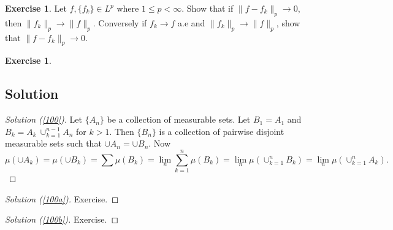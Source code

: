 \documentclass[	DIV=calc,paper=a4,fontsize=11pt]{scrartcl}	 	%
\theoremstyle{definition}
\newtheorem{exer}[thm]{Exercise}
\theoremstyle{plain}
\theoremstyle{remark}
\begin{document}
\begin{exer}\label{102}
Let $f,\{f_k\}\in L^p$ where $1\leq p<\infty$. Show that if $\|f-f_k\|_p\to 0$, then $\|f_k\|_p\to\|f\|_p$. Conversely if $f_k\to f$ a.e and $\|f_k\|_p\to\|f\|_p$, show that $\|f-f_k\|_p \to 0$.
\end{exer}

\begin{exer}\label{103}

\end{exer}

\newpage
\subsection*{Solution}
\begin{proof}[Solution (\ref{100})]
Let $\{A_n\}$ be a collection of measurable sets. Let $B_1 = A_1$ and $B_k = A_k \ \cup_{k=1}^{n-1}A_n$ for $k>1$.
Then $\{B_n\}$ is a collection of pairwise disjoint measurable sets such that $\cup A_n =\cup B_n$. Now
\[\mu(\cup A_k) =\mu(\cup B_k) =\sum \mu(B_k) = \lim_n \sum_{k=1}^n\mu(B_k)=\lim_n \mu(\cup_{k=1}^n B_k)=\lim_n \mu(\cup_{k=1}^n A_k).\]
\end{proof}

\begin{proof}[Solution (\ref{100a})]
Exercise.
\end{proof}

\begin{proof}[Solution (\ref{100b})]
Exercise.
\end{proof}
\end{document}
